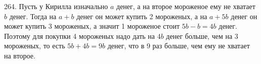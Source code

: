 264. Пусть у Кирилла изначально $a$ денег, а на второе мороженое ему не хватает $b$ денег. Тогда на $a+b$ денег он может купить 2 мороженых, а на $a+5b$ денег он может купить 3 мороженых, а значит 1 мороженое стоит $5b-b=4b$ денег. Поэтому для покупки 4 мороженых надо дать на $4b$ денег больше, чем на 3 мороженых, то есть $5b+4b=9b$ денег, что в 9 раз больше, чем ему не хватает на второе.\\
